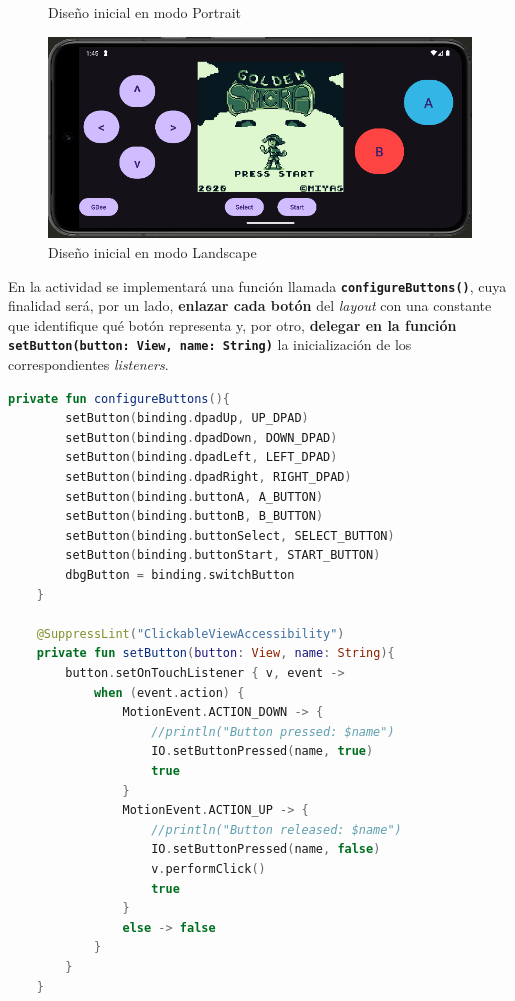\begin{figure}[H]
\begin{minipage}{0.30\textwidth}
        \caption{Diseño inicial en modo Portrait}
        \label{figure:design_1_portrait}
    \end{minipage}
    \hspace{0.05\textwidth}
    \begin{minipage}{0.50\textwidth}
        \centering
        \includegraphics[width=\textwidth]{include/images/design_1_2.png}
        \caption{Diseño inicial en modo Landscape}
        \label{figure:design_1_landscape}
    \end{minipage}
\end{figure}

En la actividad se implementará una función llamada \textbf{\texttt{configureButtons()}}, cuya finalidad será, por un lado, \textbf{enlazar cada botón} del \textit{layout} con una constante que identifique qué botón representa y, por otro, \textbf{delegar en la función \texttt{setButton(button: View, name: String)}} la inicialización de los correspondientes \textit{listeners}.

\begin{lstlisting}[language=Kotlin, caption={Enlace y Lógica de los Botones en la Actividad}, label={code:activityjoypad}]
    private fun configureButtons(){
        setButton(binding.dpadUp, UP_DPAD)
        setButton(binding.dpadDown, DOWN_DPAD)
        setButton(binding.dpadLeft, LEFT_DPAD)
        setButton(binding.dpadRight, RIGHT_DPAD)
        setButton(binding.buttonA, A_BUTTON)
        setButton(binding.buttonB, B_BUTTON)
        setButton(binding.buttonSelect, SELECT_BUTTON)
        setButton(binding.buttonStart, START_BUTTON)
        dbgButton = binding.switchButton
    }

    @SuppressLint("ClickableViewAccessibility")
    private fun setButton(button: View, name: String){
        button.setOnTouchListener { v, event ->
            when (event.action) {
                MotionEvent.ACTION_DOWN -> {
                    //println("Button pressed: $name")
                    IO.setButtonPressed(name, true)
                    true
                }
                MotionEvent.ACTION_UP -> {
                    //println("Button released: $name")
                    IO.setButtonPressed(name, false)
                    v.performClick()
                    true
                }
                else -> false
            }
        }
    }
    
\end{lstlisting}

